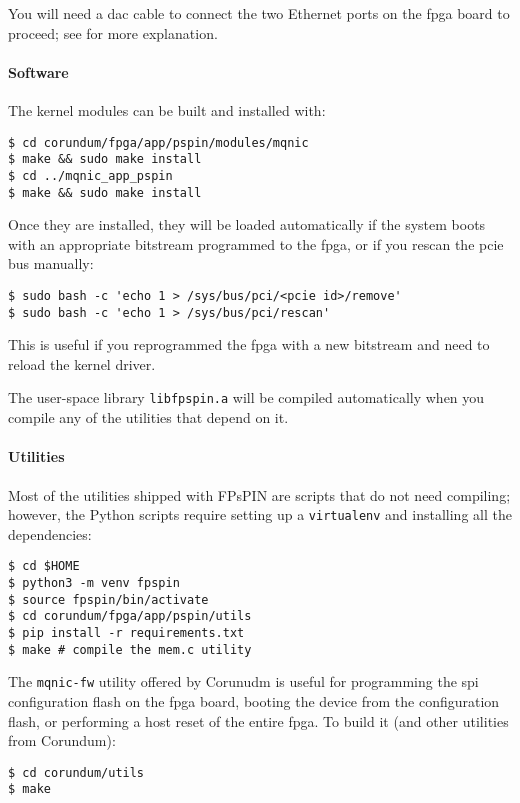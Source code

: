 You will need a \ac{dac} cable to connect the two Ethernet ports on the \ac{fpga} board to proceed; see  for more explanation.

\paragraph{Software} The kernel modules can be built and installed with:

\begin{verbatim}
$ cd corundum/fpga/app/pspin/modules/mqnic
$ make && sudo make install
$ cd ../mqnic_app_pspin
$ make && sudo make install
\end{verbatim}
Once they are installed, they will be loaded automatically if the system boots with an appropriate bitstream programmed to the \ac{fpga}, or if you rescan the \ac{pcie} bus manually:

\begin{verbatim}
$ sudo bash -c 'echo 1 > /sys/bus/pci/<pcie id>/remove'
$ sudo bash -c 'echo 1 > /sys/bus/pci/rescan'
\end{verbatim}
This is useful if you reprogrammed the \ac{fpga} with a new bitstream and need to reload the kernel driver.

The user-space library \texttt{libfpspin.a} will be compiled automatically when you compile any of the utilities that depend on it.

\paragraph{Utilities} Most of the utilities shipped with FPsPIN are scripts that do not need compiling; however, the Python scripts require setting up a \texttt{virtualenv} and installing all the dependencies:

\begin{verbatim}
$ cd $HOME
$ python3 -m venv fpspin
$ source fpspin/bin/activate
$ cd corundum/fpga/app/pspin/utils
$ pip install -r requirements.txt
$ make # compile the mem.c utility
\end{verbatim}

The \texttt{mqnic-fw} utility offered by Corunudm is useful for programming the \ac{spi} configuration flash on the \ac{fpga} board, booting the device from the configuration flash, or performing a host reset of the entire \ac{fpga}.  To build it (and other utilities from Corundum):

\begin{verbatim}
$ cd corundum/utils
$ make
\end{verbatim}

